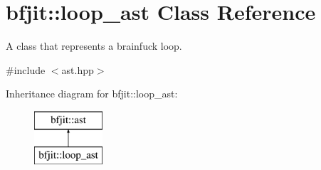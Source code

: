\hypertarget{classbfjit_1_1loop__ast}{}\section{bfjit\+:\+:loop\+\_\+ast Class Reference}
\label{classbfjit_1_1loop__ast}


A class that represents a brainfuck loop.  




{\ttfamily \#include $<$ast.\+hpp$>$}

Inheritance diagram for bfjit\+:\+:loop\+\_\+ast\+:\begin{figure}[H]
\begin{center}
\leavevmode
\includegraphics[height=2.000000cm]{classbfjit_1_1loop__ast}
\end{center}
\end{figure}

